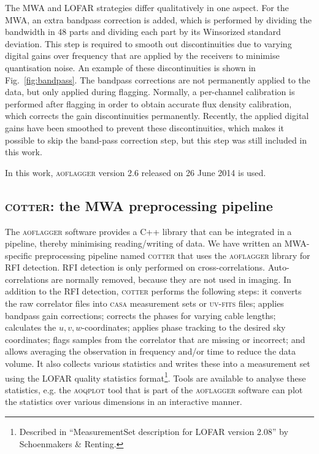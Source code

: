 \documentclass{pasa}
\begin{document}
The MWA and LOFAR strategies differ qualitatively in one aspect. For the MWA, an extra bandpass correction is added, which is performed by dividing the bandwidth in 48 parts and dividing each part by its Winsorized standard deviation. This step is required to smooth out discontinuities due to varying digital gains over frequency that are applied by the receivers to minimise quantisation noise. An example of these discontinuities is shown in Fig.~\ref{fig:bandpass}. The bandpass corrections are not permanently applied to the data, but only applied during flagging. Normally, a per-channel calibration is performed after flagging in order to obtain accurate flux density calibration, which corrects the gain discontinuities permanently. Recently, the applied digital gains have been smoothed to prevent these discontinuities, which makes it possible to skip the band-pass correction step, but this step was still included in this work. 

In this work, \textsc{aoflagger} version 2.6 released on 26 June 2014 is used.

\subsection{\textsc{cotter}: the MWA preprocessing pipeline}

The \textsc{aoflagger} software provides a C++ library %
that can be integrated in a pipeline, thereby minimising reading/writing of data. We have written an MWA-specific preprocessing pipeline named \textsc{cotter} that uses the \textsc{aoflagger} library for RFI detection. RFI detection is only performed on cross-correlations. Auto-correlations are normally removed, because they are not used in imaging. In addition to the RFI detection, \textsc{cotter} performs the following steps: it converts the raw correlator files into \textsc{casa} measurement sets or \textsc{uv-fits} files; applies bandpass gain corrections; corrects the phases for varying cable lengths; calculates the $u,v,w$-coordinates; applies phase tracking to the desired sky coordinates; flags samples from the correlator that are missing or incorrect; and allows averaging the observation in frequency and/or time to reduce the data volume. It also collects various statistics and writes these into a measurement set using the LOFAR quality statistics format\footnote{Described in ``MeasurementSet description for LOFAR version 2.08'' by Schoenmakers \& Renting.}. Tools are available to analyse these statistics, e.g. the \textsc{aoqplot} tool that is part of the \textsc{aoflagger} software can plot the statistics over various dimensions in an interactive manner.
\end{document}
